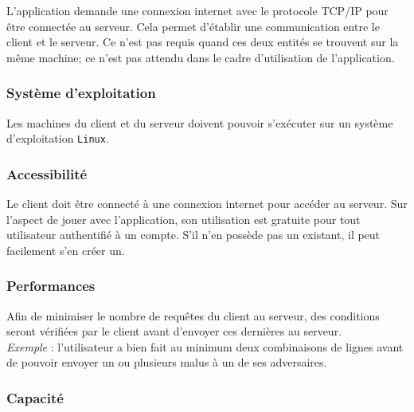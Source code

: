 \documentclass{article}
\begin{document}

L'application demande une connexion internet avec le protocole TCP/IP pour être connectée au serveur. Cela permet d'établir une communication entre le client et le serveur. Ce n'est pas requis quand ces deux entités se trouvent sur la même machine; ce n'est pas attendu dans le cadre d'utilisation de l'application.

\subsubsection{Système d'exploitation}

Les machines du client et du serveur doivent pouvoir s'exécuter sur un système d'exploitation \texttt{Linux}.

\subsubsection{Accessibilité}

Le client doit être connecté à une connexion internet pour accéder au serveur. Sur l'aspect de jouer avec l'application, son utilisation est gratuite pour tout utilisateur authentifié à un compte. S'il n'en possède pas un existant, il peut facilement s'en créer un. 

\subsubsection{Performances}


Afin de minimiser le nombre de requêtes du client au serveur, des conditions seront vérifiées par le client avant d'envoyer ces dernières au serveur. \\

\textit{Exemple} : l'utilisateur a bien fait au minimum deux combinaisons de lignes avant de pouvoir envoyer un ou plusieurs malus à un de ses adversaires.

\subsubsection{Capacité}

\end{document}
